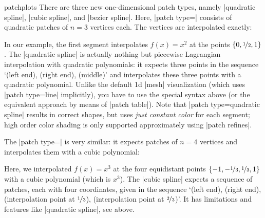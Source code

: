 {\begin{pgfplotslibrary}{patchplots}
There are three new one-dimensional patch types, namely |quadratic spline|,
|cubic spline|, and |bezier spline|. Here,
|patch type=| consists of quadratic patches
of $n=3$ vertices each. The vertices are interpolated exactly:
%
\begin{codeexample}[]
\end{codeexample}
%
\noindent In our example, the first segment interpolates $f(x)=x^2$ at the
points $\{0,\nicefrac12,1\}$. The |quadratic spline| is actually nothing but
piecewise Lagrangian interpolation with quadratic polynomials: it expects three
points in the sequence `(left end), (right end), (middle)' and interpolates
these three points with a quadratic polynomial. Unlike the default 1d |mesh|
visualization (which uses |patch type=line| implicitly), you have to use the
special syntax above (or the equivalent approach by means of |patch table|).
Note that |patch type=quadratic spline| results in correct shapes, but uses
\emph{just constant color} for each segment; high order color shading is only
supported approximately using |patch refines|.

The |patch type=| is very similar: it expects
patches of $n=4$ vertices and interpolates them with a cubic polynomial:
%
\begin{codeexample}[]
\end{codeexample}
%
\noindent Here, we interpolated $f(x)=x^3$ at the four equidistant points
$\{-1,-\nicefrac13,\nicefrac13,1\}$ with a cubic polynomial (which is $x^3$).
The |cubic spline| expects a sequence of patches, each with four coordinates,
given in the sequence `(left end), (right end), (interpolation point at
$\nicefrac13$), (interpolation point at $\nicefrac23$)'. It has limitations and
features like |quadratic spline|, see above.


\end{pgfplotslibrary}}
